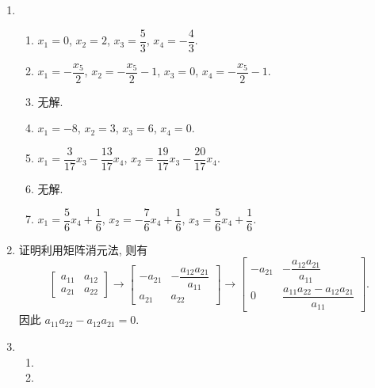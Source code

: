 \documentclass[a4paper, 11pt]{ctexart}
\begin{document}
    \begin{enumerate}
        \item %
            \begin{enumerate}[(1)]
                \item %
                    $x_1 = 0$, $x_2 = 2$, $x_3 = \dfrac53$, $x_4 = -\dfrac43$.
                \item %
                    $x_1 = -\dfrac{x_5}{2}$, $x_2 = -\dfrac{x_5}{2} - 1$, $x_3 = 0$, $x_4 = -\dfrac{x_5}{2} - 1$.
                \item %
                    无解.
                \item %
                    $x_1 = -8$, $x_2 = 3$, $x_3 = 6$, $x_4 = 0$.
                \item %
                    $x_1 = \dfrac{3}{17}x_3 - \dfrac{13}{17}x_4$, $x_2 = \dfrac{19}{17}x_3 - \dfrac{20}{17}x_4$.
                \item %
                    无解.
                \item %
                    $x_1 = \dfrac56x_4 + \dfrac16$, $x_2 = -\dfrac76x_4 + \dfrac16$, $x_3 = \dfrac56x_4 + \dfrac16$.
            \end{enumerate}
        \item %
            {\heiti 证明}\quad 利用矩阵消元法, 则有
            \[
                \begin{bmatrix}
                    a_{11} & a_{12} \\
                    a_{21} & a_{22}
                \end{bmatrix}
                \rightarrow
                \begin{bmatrix}
                    -a_{21} & -\dfrac{a_{12}a_{21}}{a_{11}} \\
                    a_{21} & a_{22}
                \end{bmatrix}
                \rightarrow
                \begin{bmatrix}
                    -a_{21} & -\dfrac{a_{12}a_{21}}{a_{11}} \\
                    0 & \dfrac{a_{11}a_{22} - a_{12}a_{21}}{a_{11}}
                \end{bmatrix}. 
            \]
            因此 $a_{11}a_{22} - a_{12}a_{21} = 0$.
        \item %
            \begin{enumerate}[(1)]
                \item %
                \item %

\end{enumerate}
\end{enumerate}
\end{document}
